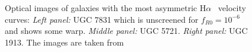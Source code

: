 \documentclass[twocolappendix, numberedappendix]{emulateapj}
\newcommand{\ha}{H$\alpha$}
\begin{document}
\begin{figure}
\caption{Optical images of  galaxies with the most asymmetric \ha~
velocity curves: {\it Left panel:} 
UGC 7831 which is unscreened for $f_{R0}=10^{-6}$ and shows some warp.  
{\it Middle panel:} UGC 5721. {\it Right panel:} UGC 1913. 
The images are taken from \citet{figgs2008}
\label{fig:eg-image-2}}
\end{figure}
\end{document}
